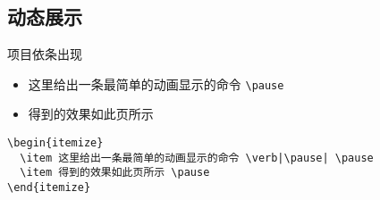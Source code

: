 \subsection{动态展示}
\begin{frame}[fragile]{项目依条出现}
	\begin{itemize}
		\item 这里给出一条最简单的动画显示的命令 \verb|\pause| \pause
		\item 得到的效果如此页所示 \pause
	\end{itemize}
\begin{lstlisting}
\begin{itemize}
  \item 这里给出一条最简单的动画显示的命令 \verb|\pause| \pause
  \item 得到的效果如此页所示 \pause
\end{itemize}
\end{lstlisting}
\end{frame}